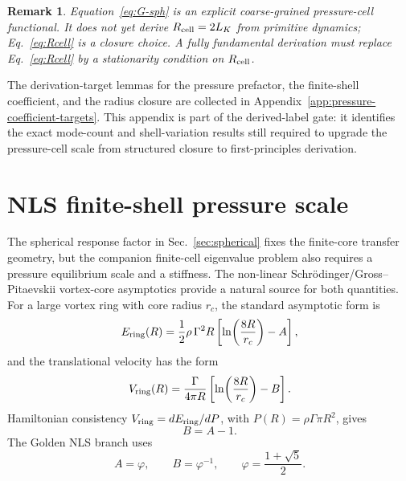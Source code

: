 \documentclass[11pt]{article}
\newtheorem{remark}{Remark}
\begin{document}
\begin{remark}
Equation~\eqref{eq:G-sph} is an explicit coarse-grained pressure-cell functional.  It does not
yet derive \(R_{\rm cell}=2L_K\) from primitive dynamics; Eq.~\eqref{eq:Rcell} is a closure
choice.  A fully fundamental derivation must replace Eq.~\eqref{eq:Rcell} by a stationarity
condition on \(R_{\rm cell}\).
\end{remark}


The derivation-target lemmas for the pressure prefactor, the finite-shell coefficient, and the radius closure are collected in Appendix~\ref{app:pressure-coefficient-targets}.  This appendix is part of the derived-label gate: it identifies the exact mode-count and shell-variation results still required to upgrade the pressure-cell scale from structured closure to first-principles derivation.

\section{NLS finite-shell pressure scale}
\label{sec:nls-shell}

The spherical response factor in Sec.~\ref{sec:spherical} fixes the finite-core transfer
geometry, but the companion finite-cell eigenvalue problem also requires a pressure
equilibrium scale and a stiffness.  The non-linear Schrödinger/Gross--Pitaevskii vortex-core
asymptotics provide a natural source for both quantities.  For a large vortex ring with core
radius \(r_c\), the standard asymptotic form is
\begin{equation}
  E_{\rm ring}(R)
  =
  \frac{1}{2}\rho\,\Gamma^2 R
  \left[
    \ln\!\left(\frac{8R}{r_c}\right)-A
  \right],
  \label{eq:nls-ring-energy}
\end{equation}
and the translational velocity has the form
\begin{equation}
  V_{\rm ring}(R)
  =
  \frac{\Gamma}{4\pi R}
  \left[
    \ln\!\left(\frac{8R}{r_c}\right)-B
  \right].
  \label{eq:nls-ring-velocity}
\end{equation}
Hamiltonian consistency \(V_{\rm ring}=dE_{\rm ring}/dP\), with
\(P(R)=\rho\Gamma\pi R^2\), gives
\begin{equation}
  B=A-1.
  \label{eq:nls-hamiltonian-constraint}
\end{equation}
The Golden NLS branch uses
\begin{equation}
  A=\varphi,\qquad B=\varphi^{-1},
  \qquad
  \varphi=\frac{1+\sqrt5}{2}.
  \label{eq:golden-branch}
\end{equation}
\end{document}
